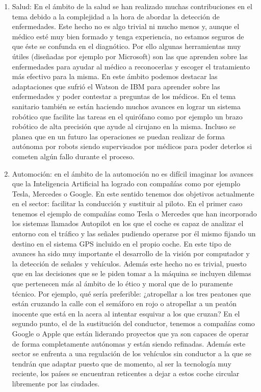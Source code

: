 \begin{enumerate}
  \item Salud: En el ámbito de la salud se han realizado muchas contribuciones en el tema debido a la complejidad a la hora de abordar la detección de enfermedades. Este hecho no es algo trivial ni mucho menos y, aunque el médico esté muy bien formado y tenga experiencia, no estamos seguros de que éste se confunda en el diagnótico. Por ello algunas herramientas muy útiles (diseñadas por ejemplo por Microsoft) son las que aprenden sobre las enfermedades para ayudar al médico a reconocerlas y escoger el tratamiento más efectivo para la misma. En este ámbito podemos destacar las adaptaciones que sufrió el Watson de IBM para aprender sobre las enfermedades y poder contestar a preguntas de los médicos. En el tema sanitario también se están haciendo muchos avances en lograr un sistema robótico que facilite las tareas en el quirófano como por ejemplo un brazo robótico de alta precisión que ayude al cirujano en la misma. Incluso se planea que en un futuro las operaciones se puedan realizar de forma autónoma por robots siendo supervisados por médicos para poder deterlos si cometen algún fallo durante el proceso.
  \item Automoción: en el ámbito de la automoción no es difícil imaginar los avances que la Inteligencia Artificial ha logrado con compañías como por ejemplo Tesla, Mercedes o Google. En este sentido tenemos dos objetivos actualmente en el sector: facilitar la conducción y sustituir al piloto. En el primer caso tenemos el ejemplo de compañías como Tesla o Mercedes que han incorporado los sistemas llamados Autopilot en los que el coche es capaz de analizar el entorno con el tráfico y las señales pudiendo operarse por él mismo fijando un destino en el sistema GPS incluido en el propio coche. En este tipo de avances ha sido muy importante el desarrollo de la visión por computador y la detección de señales y vehículos. Además este hecho no es trivial, puesto que en las decisiones que se le piden tomar a la máquina se incluyen dilemas que pertenecen más al ámbito de lo ético y moral que de lo puramente técnico. Por ejemplo, qué sería preferible: ¿atropellar a los tres peatones que están cruzando la calle con el semáforo en rojo o atropellar a un peatón inocente que está en la acera al intentar esquivar a los que cruzan? En el segundo punto, el de la sustitución del conductor, tenemos a compañías como Google o Apple que están liderando proyectos que ya son capaces de operar de forma completamente autónomas y están siendo refinadas. Además este sector se enfrenta a una regulación de los vehículos sin conductor a la que se tendrán que adaptar puesto que de momento, al ser la tecnología muy reciente, los países se encuentran reticentes a dejar a estos coche circular libremente por las ciudades.

\end{enumerate}
